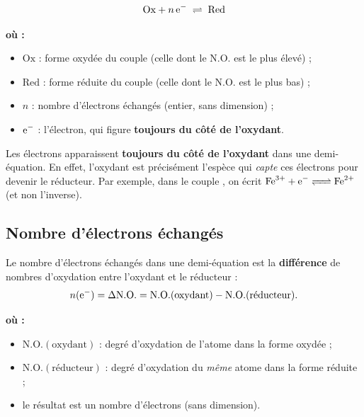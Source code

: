 \documentclass[11pt,a4paper]{article}
\newenvironment{ou}{%
  \par\smallskip\noindent\textbf{où :}\nopagebreak
  \begin{itemize}[leftmargin=1.8em,topsep=2pt,itemsep=1.5pt,parsep=0pt]}%
  {\end{itemize}}
\newcommand{\NO}{\ensuremath{\mathrm{N.O.}}}    %
\begin{document}
\begin{formule}
\[
\mathrm{Ox}+n\,\ce{e^-}\;\rightleftharpoons\;\mathrm{Red}
\]
\begin{ou}
  \item $\mathrm{Ox}$ : forme oxydée du couple (celle dont le $\NO$ est le plus élevé) ;
  \item $\mathrm{Red}$ : forme réduite du couple (celle dont le $\NO$ est le plus bas) ;
  \item $n$ : nombre d'électrons échangés (entier, sans dimension) ;
  \item $\ce{e^-}$ : l'électron, qui figure \textbf{toujours du côté de l'oxydant}.
\end{ou}
\end{formule}

\begin{attention}
Les électrons apparaissent \textbf{toujours du côté de l'oxydant} dans une demi-équation. En effet,
l'oxydant est précisément l'espèce qui \emph{capte} ces électrons pour devenir le réducteur.
Par exemple, dans le couple , on écrit
$\ce{Fe^{3+} + e^- <=> Fe^{2+}}$ (et non l'inverse).
\end{attention}

\subsection{Nombre d'électrons échangés}

\begin{formule}
Le nombre d'électrons échangés dans une demi-équation est la \textbf{différence} de nombres
d'oxydation entre l'oxydant et le réducteur :
\[
n(\ce{e^-})=\Delta\NO=\NO(\text{oxydant})-\NO(\text{réducteur}).
\]
\begin{ou}
  \item $\NO(\text{oxydant})$ : degré d'oxydation de l'atome dans la forme oxydée ;
  \item $\NO(\text{réducteur})$ : degré d'oxydation du \emph{même} atome dans la forme réduite ;
  \item le résultat est un nombre d'électrons (sans dimension).
\end{ou}
\end{formule}
\end{document}
